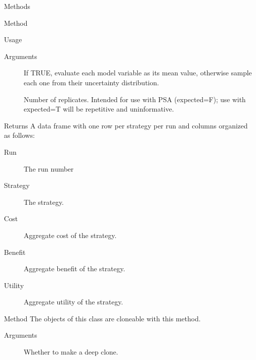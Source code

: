 \documentclass[a4paper]{book}
\begin{document}
\begin{Section}{Methods}
\begin{SubSection}{Method }
\begin{SubSubSection}{Usage}
\end{SubSubSection}


%
\begin{SubSubSection}{Arguments}

\begin{description}

\item[] If TRUE, evaluate each model variable as its mean value,
otherwise sample each one from their uncertainty distribution.

\item[] Number of replicates. Intended for use with PSA (expected=F);
use with expected=T will be repetitive and uninformative.

\end{description}


\end{SubSubSection}

%
\begin{SubSubSection}{Returns}
A data frame with one row per strategy per run and columns
organized as follows:
\begin{description}

\item[Run] The run number
\item[Strategy] The strategy.
\item[Cost] Aggregate cost of the strategy.
\item[Benefit] Aggregate benefit of the strategy.
\item[Utility] Aggregate utility of the strategy.

\end{description}

\end{SubSubSection}

\end{SubSection}



\hypertarget{method-clone}{}
%
\begin{SubSection}{Method }
The objects of this class are cloneable with this method.
%


%
\begin{SubSubSection}{Arguments}

\begin{description}

\item[] Whether to make a deep clone.

\end{description}


\end{SubSubSection}

\end{SubSection}

\end{Section}
\end{document}
